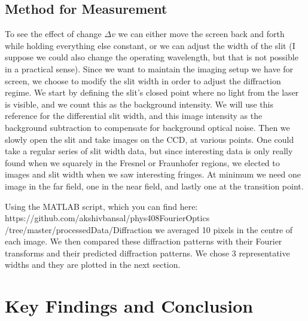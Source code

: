 \documentclass[11pt]{article}
\begin{document}
\subsection{Method for Measurement}
To see the effect of change $\Delta v$ we can either move the screen back and forth while holding everything else constant, or we can adjust the width of the slit (I suppose we could also change the operating wavelength, but that is not possible in a practical sense). Since we want to maintain the imaging setup we have for screen, we choose to modify the slit width in order to adjust the diffraction regime. We start by defining the slit’s closed point where no light from the laser is visible, and we count this as the background intensity. We will use this reference for the differential slit width, and this image intensity as the background subtraction to compensate for background optical noise. Then we slowly open the slit and take images on the CCD, at various points. One could take a regular series of slit width data, but since interesting data is only really found when we squarely in the Fresnel or Fraunhofer regions, we elected to images and slit width when we saw interesting fringes. At minimum we need one image in the far field, one in the near field, and lastly one at the transition point. 

Using the MATLAB script, which you can find here: https://github.com/akshivbansal/phys408FourierOptics\\/tree/master/processedData/Diffraction we averaged 10 pixels in the centre of each image. We then compared these diffraction patterns with their Fourier transforms and their predicted diffraction patterns. We chose 3 representative widths and they are plotted in the next section. 

\section{Key Findings and Conclusion}
\vspace{-6mm}
\end{document}
